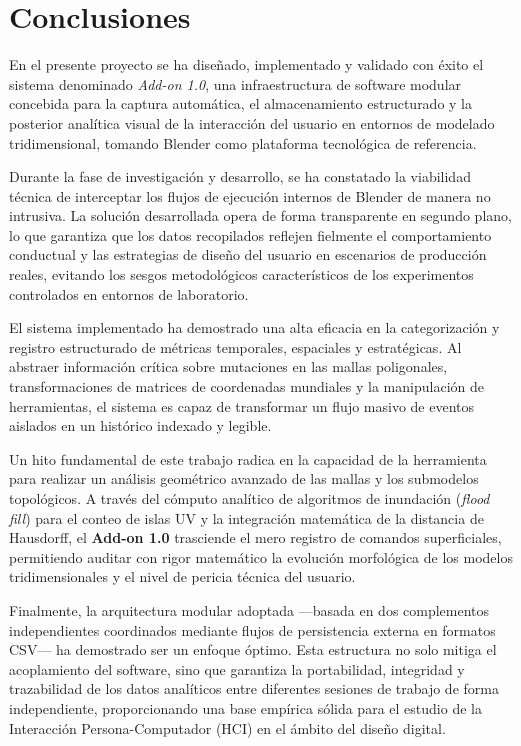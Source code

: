 
\section{Conclusiones}

En el presente proyecto se ha diseñado, implementado y validado con éxito el sistema denominado \textit{Add-on 1.0}, una infraestructura de software modular concebida para la captura automática, el almacenamiento estructurado y la posterior analítica visual de la interacción del usuario en entornos de modelado tridimensional, tomando Blender como plataforma tecnológica de referencia.

Durante la fase de investigación y desarrollo, se ha constatado la viabilidad técnica de interceptar los flujos de ejecución internos de Blender de manera no intrusiva. La solución desarrollada opera de forma transparente en segundo plano, lo que garantiza que los datos recopilados reflejen fielmente el comportamiento conductual y las estrategias de diseño del usuario en escenarios de producción reales, evitando los sesgos metodológicos característicos de los experimentos controlados en entornos de laboratorio.

El sistema implementado ha demostrado una alta eficacia en la categorización y registro estructurado de métricas temporales, espaciales y estratégicas. Al abstraer información crítica sobre mutaciones en las mallas poligonales, transformaciones de matrices de coordenadas mundiales y la manipulación de herramientas, el sistema es capaz de transformar un flujo masivo de eventos aislados en un histórico indexado y legible.

Un hito fundamental de este trabajo radica en la capacidad de la herramienta para realizar un análisis geométrico avanzado de las mallas y los submodelos topológicos. A través del cómputo analítico de algoritmos de inundación (\textit{flood fill}) para el conteo de islas UV y la integración matemática de la distancia de Hausdorff, el \textbf{Add-on 1.0} trasciende el mero registro de comandos superficiales, permitiendo auditar con rigor matemático la evolución morfológica de los modelos tridimensionales y el nivel de pericia técnica del usuario.

Finalmente, la arquitectura modular adoptada —basada en dos complementos independientes coordinados mediante flujos de persistencia externa en formatos CSV— ha demostrado ser un enfoque óptimo. Esta estructura no solo mitiga el acoplamiento del software, sino que garantiza la portabilidad, integridad y trazabilidad de los datos analíticos entre diferentes sesiones de trabajo de forma independiente, proporcionando una base empírica sólida para el estudio de la Interacción Persona-Computador (HCI) en el ámbito del diseño digital.

